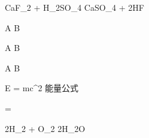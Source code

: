 
CaF_2 + H_2SO_4 \xrightarrow{\Delta} CaSO_4 + 2HF

A  B

A  B

A \xleftarrow{\Delta} B

E = mc^2 能量公式

 = 

2H_2 + O_2  2H_2O
